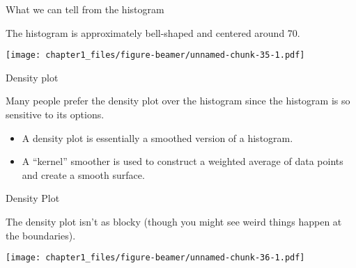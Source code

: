 \begin{frame}[fragile]{What we can tell from the histogram}
\protect\hypertarget{what-we-can-tell-from-the-histogram}{}

The histogram is approximately bell-shaped and centered around 70.

\begin{Shaded}
\begin{Highlighting}[]
\OperatorTok{$}\NormalTok{,}\NormalTok{, } \NormalTok{)}
\end{Highlighting}
\end{Shaded}

\texttt{[image: chapter1\_files/figure-beamer/unnamed-chunk-35-1.pdf]}

\end{frame}

\begin{frame}{Density plot}
\protect\hypertarget{density-plot}{}

Many people prefer the density plot over the histogram since the
histogram is so sensitive to its options.

\begin{itemize}
\tightlist
\item
  A density plot is essentially a smoothed version of a histogram.
\item
  A ``kernel'' smoother is used to construct a weighted average of data
  points and create a smooth surface.
\end{itemize}

\end{frame}

\begin{frame}[fragile]{Density Plot}
\protect\hypertarget{density-plot-1}{}

The density plot isn't as blocky (though you might see weird things
happen at the boundaries).

\begin{Shaded}
\begin{Highlighting}[]
\NormalTok{(}\OperatorTok{$}\NormalTok{),}\NormalTok{)}
\end{Highlighting}
\end{Shaded}

\texttt{[image: chapter1\_files/figure-beamer/unnamed-chunk-36-1.pdf]}

\end{frame}

